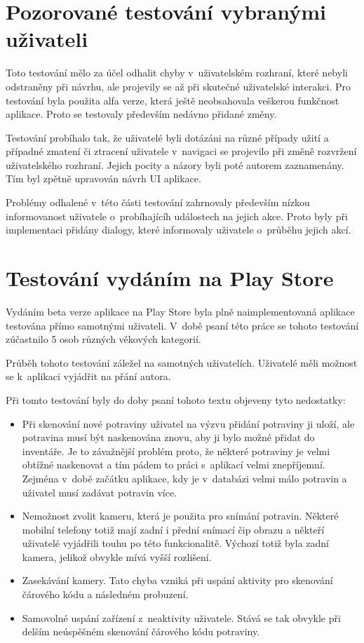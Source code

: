 \documentclass[thesis=B,czech]{FITthesis}[2013/10/20]
\begin{document}
\section{Pozorované testování vybranými uživateli}

Toto testování mělo za účel odhalit chyby v~uživatelském rozhraní, které nebyli odstraněny při návrhu, ale projevily se až při skutečné uživatelské interakci. Pro testování byla použita alfa verze, která ještě neobsahovala veškerou funkčnost aplikace. Proto se testovaly především nedávno přidané změny.

Testování probíhalo tak, že uživatelé byli dotázáni na různé případy užití a případné zmatení či ztracení uživatele v~navigaci se projevilo při změně rozvržení uživatelského rozhraní. Jejich pocity a názory byli poté autorem zaznamenány. Tím byl zpětně upravován návrh UI aplikace.

Problémy odhalené v~této části testování zahrnovaly především nízkou informovanost uživatele o~probíhajícíh událostech na jejich akce. Proto byly při implementaci přidány dialogy, které informovaly uživatele o~průběhu jejich akcí.

\section{Testování vydáním na Play Store}

Vydáním beta verze aplikace na Play Store byla plně naimplementovaná aplikace testována přímo samotnými uživateli. V~době psaní této práce se tohoto testování zúčastnilo 5 osob různých věkových kategorií.

Průběh tohoto testování záležel na samotných uživatelích. Uživatelé měli možnost se k~aplikaci vyjádřit na přání autora.

Při tomto testování byly do doby psaní tohoto textu objeveny tyto nedostatky:

\begin{itemize}
	\item{Při skenování nové potraviny uživatel na výzvu přidání potraviny ji uloží, ale potravina musí být naskenována znovu, aby ji bylo možné přidat do inventáře. Je to závažnější problém proto, že některé potraviny je velmi obtížné naskenovat a tím pádem to práci s~aplikací velmi znepříjemní. Zejména v~době začátku aplikace, kdy je v~databázi velmi málo potravin a uživatel musí zadávat potravin více.}
	\item{Nemožnost zvolit kameru, která je použita pro snímání potravin. Některé mobilní telefony totiž mají zadní i přední snímací čip obrazu a někteří uživatelé vyjádřili touhu po této funkcionalitě. Výchozí totiž byla zadní kamera, jelikož obvykle mívá vyšší rozlišení.}
	\item{Zasekávání kamery. Tato chyba vzniká při uspání aktivity pro skenování čárového kódu a následném probuzení.}
	\item{Samovolné uspání zařízení z~neaktivity uživatele. Stává se tak obvykle při delším neúspěšném skenování čárového kódu potraviny.}
\end{itemize}
\end{document}

